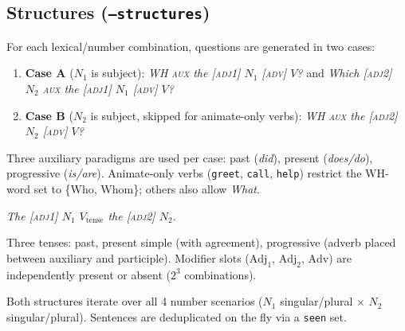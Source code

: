 \documentclass[11pt]{article}
\begin{document}
\subsection*{Structures (\texttt{--structures})}

\begin{description}[leftmargin=2em]
  \item[1 --- WH-Questions] For each lexical/number combination, questions are generated in two cases:

  \begin{enumerate}
    \item \textbf{Case A} ($N_1$ is subject): \textit{WH \textsc{aux} the [\textsc{adj1}] $N_1$ [\textsc{adv}] $V$?} \quad and \quad \textit{Which [\textsc{adj2}] $N_2$ \textsc{aux} the [\textsc{adj1}] $N_1$ [\textsc{adv}] $V$?}
    \item \textbf{Case B} ($N_2$ is subject, skipped for animate-only verbs): \textit{WH \textsc{aux} the [\textsc{adj2}] $N_2$ [\textsc{adv}] $V$?}
  \end{enumerate}

  Three auxiliary paradigms are used per case: past (\textit{did}), present (\textit{does/do}), progressive (\textit{is/are}). Animate-only verbs (\texttt{greet}, \texttt{call}, \texttt{help}) restrict the WH-word set to \{Who, Whom\}; others also allow \textit{What}.

  \item[2 --- Declaratives] \textit{The [\textsc{adj1}] $N_1$ $V_\text{tense}$ the [\textsc{adj2}] $N_2$.}

  Three tenses: past, present simple (with agreement), progressive (adverb placed between auxiliary and participle). Modifier slots ($\text{Adj}_1$, $\text{Adj}_2$, $\text{Adv}$) are independently present or absent ($2^3$ combinations).
\end{description}

Both structures iterate over all 4 number scenarios ($N_1$ singular/plural $\times$ $N_2$ singular/plural). Sentences are deduplicated on the fly via a \texttt{seen} set.
\end{document}
